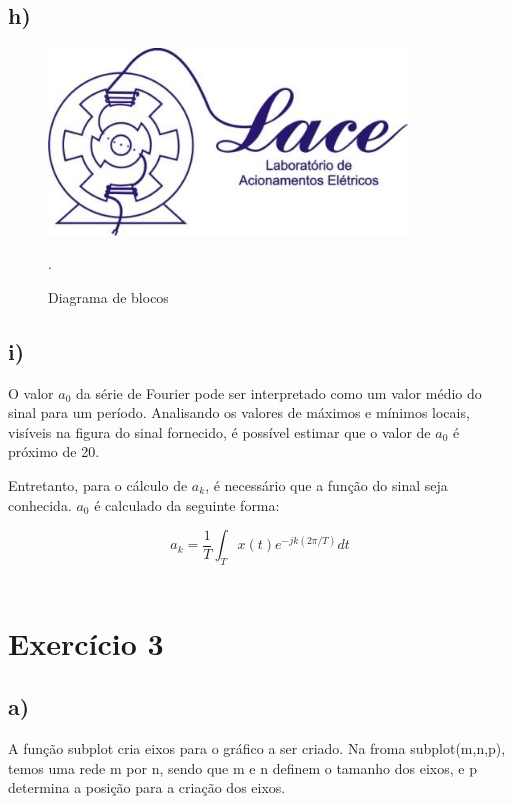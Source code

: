 \documentclass[a4paper,12pt,oneside,openany,table,xcdraw]{article}
\begin{document}
\subsection{h)}

\begin{figure}[H]
    \centering
    \includegraphics[width=0.85\textwidth]{a}
    \caption{Diagrama de blocos}.
    \label{fig:my_label}
\end{figure}

\subsection{i)}


O valor $a_0$ da série de Fourier pode ser interpretado como um valor médio do sinal para um período. Analisando os valores de máximos e mínimos locais, visíveis na figura do sinal fornecido, é possível estimar que o valor de $a_0$ é próximo de 20.

Entretanto, para o cálculo de $a_k$, é necessário que a função do sinal seja conhecida. $a_0$ é calculado da seguinte forma:

\begin{center}
    $$a_k = \frac{1}{T}\int_{T}^{} x(t)e^{-jk(2\pi/T)} dt$$\\
\end{center}


\section{Exercício 3}

\subsection{a)}

A função subplot cria eixos para o gráfico a ser criado. Na froma subplot(m,n,p), temos uma rede m por n, sendo que m e n definem o tamanho dos eixos, e p determina a posição para a criação dos eixos.  
\end{document}

